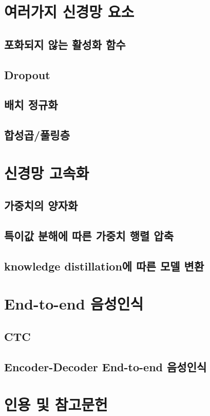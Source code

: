 \documentclass[../main.tex]{subfiles}
\begin{document}
\section{여러가지 신경망 요소}
\subsection{포화되지 않는 활성화 함수}
\subsection{Dropout}
\subsection{배치 정규화}
\subsection{합성곱/풀링층}

\section{신경망 고속화}
\subsection{가중치의 양자화}
\subsection{특이값 분해에 따른 가중치 행렬 압축}
\subsection{knowledge distillation에 따른 모델 변환}

\section{End-to-end 음성인식}
\subsection{CTC}
\subsection{Encoder-Decoder End-to-end 음성인식}

\section*{인용 및 참고문헌}
\end{document}
